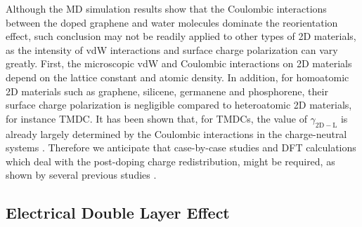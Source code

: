 Although the MD simulation results show that the Coulombic
interactions between the doped graphene and water molecules dominate
the reorientation effect, such conclusion may not be readily applied
to other types of 2D materials, as the intensity of vdW interactions
and surface charge polarization can vary greatly. First, the
microscopic vdW and Coulombic interactions on 2D materials depend on
the lattice constant and atomic density. In addition, for homoatomic
2D materials such as graphene, silicene, germanene and phosphorene,
their surface charge polarization is negligible compared to
heteroatomic 2D materials, for instance TMDC. It has been shown that,
for TMDCs, the value of \(\gamma_{\mathrm{2D-L}}\) is already largely
determined by the Coulombic interactions in the charge-neutral systems
\cite{Govind_Rajan_2016,Chow_2015_wetting_WS2}. Therefore we anticipate that
case-by-case studies and DFT calculations which deal with the
post-doping charge redistribution, might be required, as shown by
several previous studies
\cite{Sresht_2015,Govind_Rajan_2016,Sresht_2017_mos2-liquid}.


\subsection{Electrical Double Layer Effect}
\label{sec:org492fdee}

